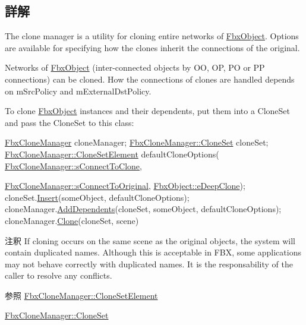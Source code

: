 \subsection{詳解}
The clone manager is a utility for cloning entire networks of \hyperlink{class_fbx_object}{Fbx\+Object}. Options are available for specifying how the clones inherit the connections of the original.

Networks of \hyperlink{class_fbx_object}{Fbx\+Object} (inter-\/connected objects by OO, OP, PO or PP connections) can be cloned. How the connections of clones are handled depends on m\+Src\+Policy and m\+External\+Dst\+Policy.

To clone \hyperlink{class_fbx_object}{Fbx\+Object} instances and their dependents, put them into a Clone\+Set and pass the Clone\+Set to this class\+: 
\begin{DoxyCode}
\hyperlink{class_fbx_clone_manager}{FbxCloneManager}                  cloneManager;
\hyperlink{class_fbx_map}{FbxCloneManager::CloneSet}        cloneSet;
\hyperlink{struct_fbx_clone_manager_1_1_clone_set_element}{FbxCloneManager::CloneSetElement} defaultCloneOptions(
      \hyperlink{class_fbx_clone_manager_ab70c9534523f7e45b21372ff0b2eb109}{FbxCloneManager::sConnectToClone},
                                                     
      \hyperlink{class_fbx_clone_manager_a5a951074ea2c085555fa95b877c56591}{FbxCloneManager::sConnectToOriginal}, 
                                                     \hyperlink{class_fbx_object_a9f5626b2d2135684d6ea1e6e4ad2acbbaacdf137ca059c572798287e98c4236d0}{FbxObject::eDeepClone});
cloneSet.\hyperlink{class_fbx_map_a520c1d971dfe2401aa3d9824a0344ce4}{Insert}(someObject, defaultCloneOptions);
cloneManager.\hyperlink{class_fbx_clone_manager_a3a7786f536d8f61f0b84f114e6e870d2}{AddDependents}(cloneSet, someObject, defaultCloneOptions);
cloneManager.\hyperlink{class_fbx_clone_manager_a2fd72cbf71c6dd3105310445c1a7c2b1}{Clone}(cloneSet, scene)
\end{DoxyCode}


\begin{DoxyRemark}{注釈}
If cloning occurs on the same scene as the original objects, the system will contain duplicated names. Although this is acceptable in F\+BX, some applications may not behave correctly with duplicated names. It is the responsability of the caller to resolve any conflicts.
\end{DoxyRemark}
\begin{DoxySeeAlso}{参照}
\hyperlink{struct_fbx_clone_manager_1_1_clone_set_element}{Fbx\+Clone\+Manager\+::\+Clone\+Set\+Element} 

\hyperlink{class_fbx_clone_manager_aeb8a9c04c9c36eb7e551186a0b18f10d}{Fbx\+Clone\+Manager\+::\+Clone\+Set} 
\end{DoxySeeAlso}


